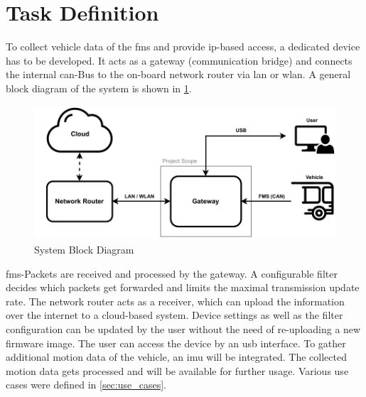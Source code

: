 \section{Task Definition}
To collect vehicle data of the \acrfull{fms} and provide \acrshort{ip}-based access, a dedicated device has to be developed. It acts as a gateway (communication bridge) and connects the internal \acrshort{can}-Bus to the on-board network router via \acrshort{lan} or \acrshort{wlan}. \newline
A general block diagram of the system is shown in \cref{fig:system_block_diagram}.

\medskip
\begin{figure}[h!]
	\centering
	\includegraphics[height=5cm]{images/Block_Diagram}
	\caption{System Block Diagram}
	\label{fig:system_block_diagram}
\end{figure}

\acrshort{fms}-Packets are received and processed by the gateway. A configurable filter decides which packets get forwarded and limits the maximal transmission update rate. The network router acts as a receiver, which can upload the information  over the internet to a cloud-based system.
Device settings as well as the filter configuration can be updated by the user without the need of re-uploading a new firmware image. The user can access the device by an \acrshort{usb} interface. \newline
To gather additional motion data of the vehicle, an \acrfull{imu} will be integrated.
The collected motion data gets processed and will be available for further usage. \newline
\newline
Various use cases were defined in \cref{sec:use_cases}.